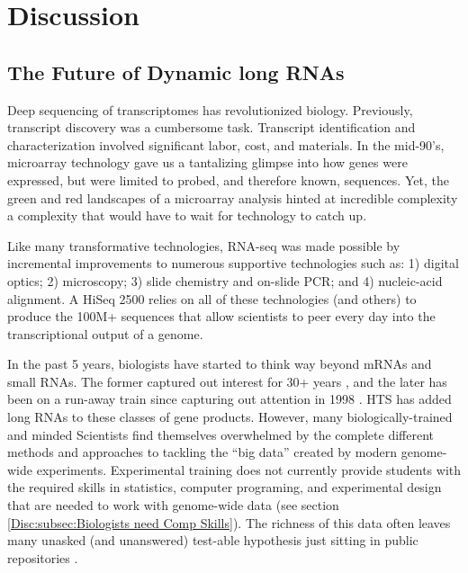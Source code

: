 \chapter{Discussion} \label{Disc}

\section{The Future of Dynamic long RNAs}\label{Disc:sec:Future of Dynamic long RNAs}

  Deep sequencing of transcriptomes has revolutionized biology. Previously, transcript discovery was a cumbersome task. Transcript identification and characterization involved significant labor, cost, and materials. In the mid-90's, microarray technology \citep{Schena1995a} gave us a tantalizing glimpse into how genes were expressed, but were limited to probed, and therefore known, sequences. Yet, the green and red landscapes of a microarray analysis hinted at incredible complexity \textemdash a complexity that would have to wait for technology to catch up.

  Like many transformative technologies, RNA-seq was made possible by incremental improvements to numerous supportive technologies such as: 1) digital optics; 2) microscopy; 3) slide chemistry and on-slide PCR; and 4) nucleic-acid alignment. A HiSeq 2500 relies on all of these technologies (and others) to produce the 100M+ sequences that allow scientists to peer every day into the transcriptional output of a genome.

  In the past 5 years, biologists have started to think way beyond mRNAs and small RNAs. The former captured out interest for 30+ years \citep{Furuichi1975,Wei1975}, and the later has been on a run-away train since capturing out attention in 1998 \citep{Fire1998}. HTS has added long RNAs to these classes of gene products. However, many biologically-trained and minded Scientists find themselves overwhelmed by the complete different methods and approaches to tackling the ``big data'' created by modern genome-wide experiments. Experimental training does not currently provide students with the required skills in statistics, computer programing, and experimental design that are needed to work with genome-wide data (see section \ref{Disc:subsec:Biologists need Comp Skills}). The richness of this data often leaves many unasked (and unanswered) test-able hypothesis just sitting in public repositories \citep{Plocik2013}.

